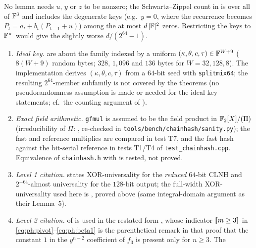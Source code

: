 \begin{remark}
No lemma needs $u$, $y$ or $z$ to be nonzero; the Schwartz--Zippel count in
 is over all of $\mathbb{F}^3$ and includes the degenerate keys
(e.g.\ $y=0$, where the recurrence becomes $P_t=a_t+b_t(P_{t-1}+u)$) among the
at most $d\,|\mathbb{F}|^2$ zeros.  Restricting the keys to $\mathbb{F}^\times$ would give the
slightly worse $d/(2^{64}-1)$.
\end{remark}

\begin{remark}\label{rem:ph:gaps}
\begin{enumerate}[label=(A\arabic*)]
\item \emph{Ideal key.}   are about the family
      indexed by a uniform $(\kappa,\theta,c,\tau)\in\mathbb{F}^{W+9}$ ($8(W+9)$ random
      bytes; $328$, $1{,}096$ and $136$ bytes for $W=32,128,8$).  The
      implementation derives $(\kappa,\theta,c,\tau)$ from a $64$-bit seed with
      \texttt{splitmix64}; the resulting $2^{64}$-member subfamily is not
      covered by the theorems (no pseudorandomness assumption is made or
      needed for the ideal-key statements; cf.\ the counting argument of
      \cite[\S2.5]{lemire2015clhash}).
\item \emph{Exact field arithmetic.}  \texttt{gfmul} is assumed to be the field
      product in $\mathbb{F}_2[X]/(\Pi)$ (irreducibility of $\Pi$: \cite[\S4.3]{lemire2015clhash},
      re-checked in \texttt{tools/bench/chainhash/sanity.py}); the fast and reference
      multiplies are compared in test T7, and the fast hash against the
      bit-serial reference in tests T1/T4 of \texttt{test\_\allowbreak chainhash.cpp}.
      Equivalence of \texttt{chainhash.h} with  is tested, not proved.
\item \emph{Level 1 citation.}  \cite{lemire2015clhash} states XOR-universality
      for the \emph{reduced} $64$-bit CLNH and $2^{-64}$-almost universality for
      the $128$-bit output; the full-width XOR-universality used here is
      , proved above (same integral-domain argument as their Lemma~5).
\item \emph{Level 2 citation.}   of 
      is used in the restated form , whose indicator
      $[\![m\ge3]\!]$ in \eqref{eq:ph:pivot}--\eqref{eq:ph:beta1} is the
      parenthetical remark in that proof that the constant $1$ in the
      $y^{n-2}$ coefficient of $f_3$ is present only for $n\ge3$.  The

\end{enumerate}
\end{remark}
